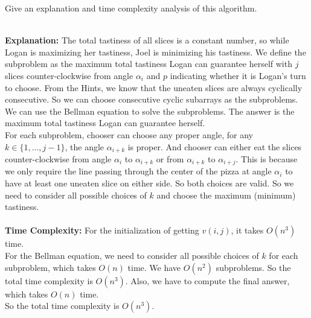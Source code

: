 \begin{parts}
    \newpage

    \bonuspart[2] Give an explanation and time complexity analysis of this algorithm.
    \begin{solution}
        \\
        \textbf{Explanation:}
        The total tastiness of all slices is a constant number, so while Logan is maximizing her tastiness, Joel is minimizing his tastiness. We define the subproblem as the maximum total tastiness Logan can guarantee herself with $j$ slices counter-clockwise from angle $\alpha_i$ and $p$ indicating whether it is Logan's turn to choose. From the Hints, we know that the uneaten slices are always cyclically consecutive. So we can choose consecutive cyclic subarrays as the subproblems. We can use the Bellman equation to solve the subproblems. The answer is the maximum total tastiness Logan can guarantee herself.\\
        For each subproblem, chooser can choose any proper angle, for any $k \in \{1,...,j-1\}$, the angle $\alpha_{i+k}$ is proper. And chooser can either eat the slices counter-clockwise from angle $\alpha_i$ to $\alpha_{i+k}$ or from $\alpha_{i+k}$ to $\alpha_{i + j}$. This is because we only require the line passing through the center of the pizza at angle $\alpha_i$ to have at least one uneaten slice on either side. So both choices are valid.
         So we need to consider all possible choices of $k$ and choose the maximum (minimum) tastiness.\\
        \hspace{1cm} \\
        \textbf{Time Complexity:}
        For the initialization of getting $v(i, j)$, it takes $O(n^3)$ time. \\
        For the Bellman equation, we need to consider all possible choices of $k$ for each subproblem, which takes $O(n)$ time. We have $O(n^2)$ subproblems. So the total time complexity is $O(n^3)$.
        Also, we have to compute the final answer, which takes $O(n)$ time.\\
        So the total time complexity is $O(n^3)$.
    \end{solution}

    
\end{parts}